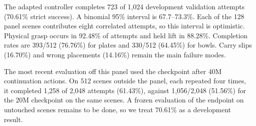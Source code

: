 The adapted controller completes 723 of 1,024 development validation attempts (70.61\% strict success). A binomial 95\% interval is 67.7--73.3\%. Each of the 128 panel scenes contributes eight correlated attempts, so this interval is optimistic. Physical grasp occurs in 92.48\% of attempts and held lift in 88.28\%. Completion rates are 393/512 (76.76\%) for plates and 330/512 (64.45\%) for bowls. Carry slips (16.70\%) and wrong placements (14.16\%) remain the main failure modes.

The most recent evaluation off this panel used the checkpoint after 40M continuation actions. On 512 scenes outside the panel, each repeated four times, it completed 1,258 of 2,048 attempts (61.43\%), against 1,056/2,048 (51.56\%) for the 20M checkpoint on the same scenes. A frozen evaluation of the endpoint on untouched scenes remains to be done, so we treat 70.61\% as a development result.
